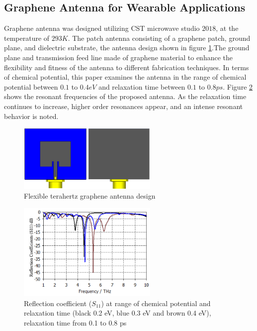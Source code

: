 \documentclass[12pt]{suhbook}
\begin{document}
\subsection{Graphene Antenna for Wearable Applications}
Graphene antenna was designed utilizing CST microwave studio $2018$, at the temperature of $293 K$. The patch antenna consisting of a graphene patch, ground plane, and dielectric substrate, the antenna design shown in figure \ref{Fig 1}.The ground plane and transmission feed line made of graphene material to enhance the flexibility and fitness of the antenna to different fabrication techniques. In terms of chemical potential, this paper examines the antenna in the range of chemical potential between $0.1$ to $0.4 eV$ and relaxation time between $0.1$ to $0.8 ps$. Figure \ref{Fig 2} shows the resonant frequencies of the proposed antenna. As the relaxation time continues to increase, higher order resonances appear, and an intense resonant behavior is noted.
\begin{figure}[hbt!]
    \centering
    \includegraphics[width=0.6\textwidth]{1}
    \caption{Flexible terahertz graphene antenna design}
    \label{Fig 1}
\end{figure}
\begin{figure}[h]
    \centering
    \includegraphics[width=0.6\textwidth]{2}
    \caption{Reflection coefficient ($S_{11}$) at range of chemical potential and relaxation time (black 0.2 eV, blue 0.3 eV and brown 0.4 eV), relaxation time from 0.1 to 0.8 ps}
    \label{Fig 2}
\end{figure}
\end{document}
